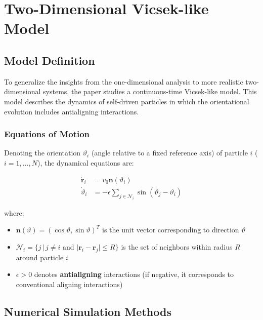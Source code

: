
\section{Two-Dimensional Vicsek-like Model}\label{sec:2d-model}

\subsection{Model Definition}

To generalize the insights from the one-dimensional analysis to more realistic two-dimensional systems, the paper studies a continuous-time Vicsek-like model\cite{boltz2025}. This model describes the dynamics of self-driven particles in which the orientational evolution includes antialigning interactions.

\subsubsection{Equations of Motion}

Denoting the orientation $\vartheta_i$ (angle relative to a fixed reference axis) of particle $i$ ($i = 1, \ldots, N$), the dynamical equations are:

\begin{keybox}
\begin{align}
\dot{\mathbf{r}}_i &= v_0 \mathbf{n}(\vartheta_i) \label{eq:vicsek-pos}\\
\dot{\vartheta}_i &= -\epsilon \sum_{j \in \mathcal{N}_i} \sin(\vartheta_j - \vartheta_i) \label{eq:vicsek-angle}
\end{align}
\end{keybox}

where:
\begin{itemize}
    \item $\mathbf{n}(\vartheta) = (\cos\vartheta, \sin\vartheta)^T$ is the unit vector corresponding to direction $\vartheta$
    \item $\mathcal{N}_i = \{j \,|\, j \neq i \text{ and } |\mathbf{r}_i - \mathbf{r}_j| \leq R\}$ is the set of neighbors within radius $R$ around particle $i$
    \item $\epsilon > 0$ denotes \textbf{antialigning} interactions (if negative, it corresponds to conventional aligning interactions)
\end{itemize}

\subsection{Numerical Simulation Methods}

